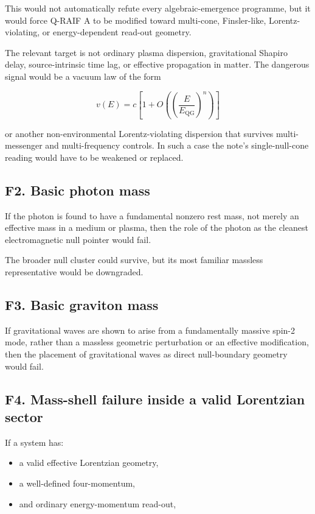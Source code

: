 \documentclass[12pt,a4paper]{article}
\theoremstyle{definition}
\theoremstyle{remark}
\newcommand{\tightlist}{%
  \setlength{\itemsep}{0pt}\setlength{\parskip}{0pt}}
\begin{document}
This would not automatically refute every algebraic-emergence programme,
but it would force Q-RAIF A to be modified toward multi-cone,
Finsler-like, Lorentz-violating, or energy-dependent read-out geometry.

The relevant target is not ordinary plasma dispersion, gravitational
Shapiro delay, source-intrinsic time lag, or effective propagation in
matter. The dangerous signal would be a vacuum law of the form

\[
v(E)=c\left[1+O\!\left(\left(\frac{E}{E_{\mathrm{QG}}}\right)^n\right)\right]
\]

or another non-environmental Lorentz-violating dispersion that survives
multi-messenger and multi-frequency controls. In such a case the note's
single-null-cone reading would have to be weakened or replaced.

\subsection{F2. Basic photon mass}\label{f2.-basic-photon-mass}

If the photon is found to have a fundamental nonzero rest mass, not
merely an effective mass in a medium or plasma, then the role of the
photon as the cleanest electromagnetic null pointer would fail.

The broader null cluster could survive, but its most familiar massless
representative would be downgraded.

\subsection{F3. Basic graviton mass}\label{f3.-basic-graviton-mass}

If gravitational waves are shown to arise from a fundamentally massive
spin-2 mode, rather than a massless geometric perturbation or an
effective modification, then the placement of gravitational waves as
direct null-boundary geometry would fail.

\subsection{F4. Mass-shell failure inside a valid Lorentzian
sector}\label{f4.-mass-shell-failure-inside-a-valid-lorentzian-sector}

If a system has:

\begin{itemize}
\tightlist
\item
  a valid effective Lorentzian geometry,
\item
  a well-defined four-momentum,
\item
  and ordinary energy-momentum read-out,
\end{itemize}
\end{document}
